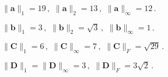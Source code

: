 {\begin{abc}
% 
\end{abc}
}

{
$\|\boldsymbol{a}\|_{1} = 19\,,\,\,
\|\boldsymbol{a}\|_{2} = 13\,,\,\,
\|\boldsymbol{a}\|_{\infty} = 12\,.$

$\|\boldsymbol{b}\|_{1} = 3\,,\,\,
\|\boldsymbol{b}\|_{2} = \sqrt{3}\,,\,\,
\|\boldsymbol{b}\|_{\infty} = 1\,.$

$\|\boldsymbol{C}\|_{1} = 6\,,\,\,
\|\boldsymbol{C}\|_{\infty} = 7\,,\,\,
\|\boldsymbol{C}\|_{F} = \sqrt{29}\,.$%

$\|\boldsymbol{D}\|_{1} = \|\boldsymbol{D}\|_{\infty} = 3\,,\,\,
\|\boldsymbol{D}\|_{F} = 3\sqrt{2}\,.$%
}
